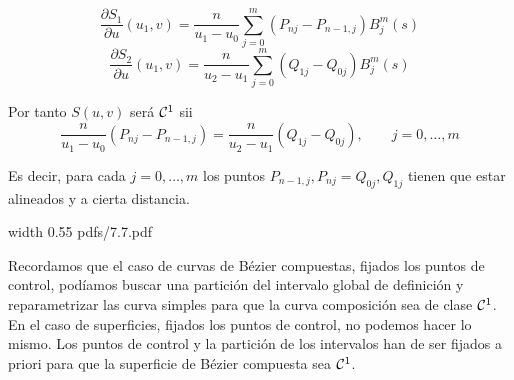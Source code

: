 \documentclass[twoside]{report}
\newcommand{\colocapdf}[2]{\quad\pdfimage width #2 {pdfs/#1.pdf}}
\begin{document}
$$\frac{\partial S_1}{\partial u}(u_1,v)= \frac{n}{u_1-u_0} \sum_{j=0}^{m} (P_{nj}-P_{n-1,j}) B_j^{m}(s)$$
$$\frac{\partial S_2}{\partial u}(u_1,v)= \frac{n}{u_2-u_1} \sum_{j=0}^{m} (Q_{1j}-Q_{0j}) B_j^{m}(s)$$

Por tanto $S(u,v)$ será ${\cal C}^1$ sii
$$\frac{n}{u_1-u_0}(P_{nj}-P_{n-1,j})= \frac{n}{u_2-u_1}(Q_{1j}-Q_{0j}), \quad \quad j=0,\ldots,m$$

Es decir, para cada $j=0,\ldots,m$ los puntos $P_{n-1,j}, P_{nj}=Q_{0j}, Q_{1j}$ tienen que estar alineados y a cierta distancia.

\begin{center}
\colocapdf{7.7}{0.55\textwidth}
\end{center}

Recordamos que el caso de curvas de Bézier compuestas, fijados los puntos de control, podíamos buscar una partición del intervalo global de definición y reparametrizar las curva simples para que la curva composición sea de clase ${\cal C}^1$. En el caso de superficies, fijados los puntos de control, no podemos hacer lo mismo. Los puntos de control y la partición de los intervalos han de ser fijados a priori para que la superficie de Bézier compuesta sea ${\cal C}^1$.
\end{document}
